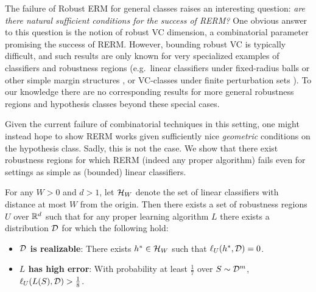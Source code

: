 The failure of Robust ERM for general classes raises an interesting question: \textit{are there natural sufficient conditions for the success of RERM?} One obvious answer to this question is the notion of robust VC dimension, a combinatorial parameter promising the success of RERM. However, bounding robust VC is typically difficult, and such results are only known for very specialized examples of classifiers and robustness regions (e.g.\ linear classifiers under fixed-radius balls \citep{Cullina18} or other simple margin structures \cite{pathak20}, or VC-classes under finite perturbation sets \citep{attias19}). To our knowledge there are no corresponding results for more general robustness regions and hypothesis classes beyond these special cases.


Given the current failure of combinatorial techniques in this setting, one might instead hope to show RERM works given sufficiently nice \textit{geometric} conditions on the hypothesis class. Sadly, this is not the case. We show that there exist robustness regions for which RERM (indeed any proper algorithm) fails even for settings as simple as (bounded) linear classifiers.
\begin{thm}\label{thm:intro1}
For any $W>0$ and $d>1$, let $\mathcal H_W$ denote the set of linear classifiers with distance at most $W$ from the origin. Then there exists a set of robustness regions $U$ over $\mathbb{R}^d$ such that for any proper learning algorithm $L$ there exists a distribution $\mathcal D$ for which the following hold:
\begin{itemize}
	\item \textbf{$\mathcal D$ is realizable}: There exists $h^* \in \mathcal H_W$ such that $\ell_U(h^*, \mathcal D) = 0$.
	\item \textbf{$L$ has high error}: With probability at least $\frac{1}{7}$ over $S \sim \mathcal D^m$, $\ell_U(L(S), \mathcal D) > \frac{1}{8}$. 
\end{itemize}
\end{thm}


